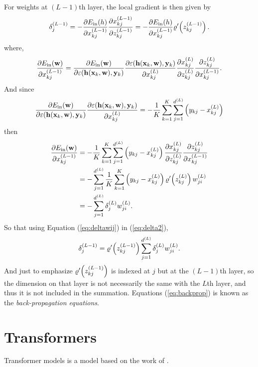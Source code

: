 For weights at $(L-1)$th layer, the local gradient is then given by
\begin{equation}\label{eq:delta2}
\delta_{j}^{(L-1)}=-\frac{\partial E_{\mathrm{in}}(h)}{\partial x_{kj}^{(L-1)}}\frac{\partial x_{kj}^{(L-1)}}{\partial z_{kj}^{(L-1)}}=-\frac{\partial E_{\mathrm{in}}(h)}{\partial x_{kj}^{(L-1)}}\varrho'\!\left(z_{kj}^{(L-1)}\right).
\end{equation}
where,
\begin{equation}
\frac{\partial E_{\mathrm{in}}(\mathbf{w})}{\partial x_{kj}^{(L-1)}}=\frac{\partial E_{\mathrm{in}}(\mathbf{w})}{\partial \varepsilon(\mathbf{h}(\mathbf{x}_k,\mathbf{w}),\mathbf{y}_{k})}\frac{\partial \varepsilon(\mathbf{h}(\mathbf{x}_k,\mathbf{w}),\mathbf{y}_{k})}{\partial x_{kj}^{(L)}}\frac{\partial x_{kj}^{(L)}}{\partial z_{kj}^{(L)}}\frac{\partial z_{kj}^{(L)}}{\partial x_{kj}^{(L-1)}}.
\end{equation}
And since
\begin{equation}
\frac{\partial E_{\mathrm{in}}(\mathbf{w})}{\partial \varepsilon(\mathbf{h}(\mathbf{x}_k,\mathbf{w}),\mathbf{y}_{k})}\frac{\partial \varepsilon(\mathbf{h}(\mathbf{x}_k,\mathbf{w}),\mathbf{y}_{k})}{\partial x_{kj}^{(L)}}=-\frac{1}{K}\sum_{k=1}^{K}\sum_{j=1}^{d^{(L)}}\left(y_{kj}-x_{kj}^{(L)}\right)
\end{equation}
then
\begin{align}
\frac{\partial E_{\mathrm{in}}(\mathbf{w})}{\partial x_{kj}^{(L-1)}}&=-\frac{1}{K}\sum_{k=1}^{K}\sum_{j=1}^{d^{(L)}}\left(y_{kj}-x_{kj}^{(L)}\right)\frac{\partial x_{kj}^{(L)}}{\partial z_{kj}^{(L)}}\frac{\partial z_{kj}^{(L)}}{\partial x_{kj}^{(L-1)}}\nonumber\\
&=-\sum_{j=1}^{d^{(L)}}\frac{1}{K}\sum_{k=1}^{K}\left(y_{kj}-x_{kj}^{(L)}\right)\varrho'\!\left(z_{kj}^{(L)}\right)w_{ji}^{(L)}\nonumber\\
&=-\sum_{j=1}^{d^{(L)}}\delta_j^{(L)}w_{ji}^{(L)}.\label{eq:deltawij}
\end{align}
So that using Equation (\ref{eq:deltawij}) in (\ref{eq:delta2}),
\begin{equation}\label{eq:backprop}
\delta_{j}^{(L-1)}=\varrho'\!\left(z_{kj}^{(L-1)}\right)\sum_{j=1}^{d^{(L)}}\delta_j^{(L)}w_{ji}^{(L)}.
\end{equation}
And just to emphasize $\varrho'\!\left(z_{kj}^{(L-1)}\right)$ is indexed at $j$ but at the $(L-1)$th layer, so the dimension on that layer is not necessarily the same with the $L$th layer, and thus it is not included in the summation. Equations (\ref{eq:backprop}) is known as the \textit{back-propagation equations}.

\section{Transformers}\label{sec:transformers}
Transformer models is a model based on the work of \cite{vaswani2017attention}.